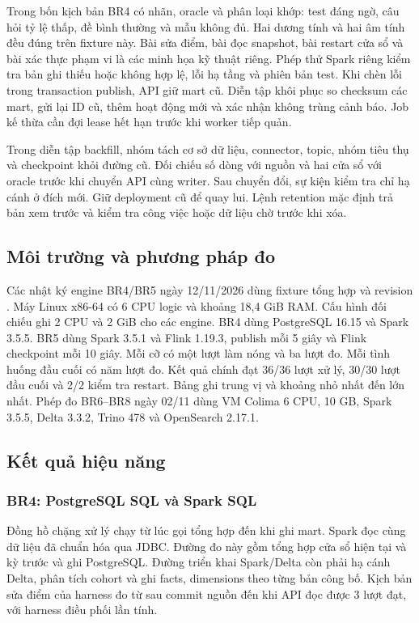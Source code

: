 Trong bốn kịch bản BR4 có nhãn, oracle và phân loại khớp: test đáng ngờ, câu hỏi tỷ lệ thấp, đề bình thường và mẫu không đủ. Hai dương tính và hai âm tính đều đúng trên fixture này. Bài sửa điểm, bài đọc snapshot, bài restart cửa sổ và bài xác thực phạm vi là các minh họa kỹ thuật riêng. Phép thử Spark riêng kiểm tra bản ghi thiếu hoặc không hợp lệ, lỗi hạ tầng và phiên bản test. Khi chèn lỗi trong transaction publish, API giữ mart cũ. Diễn tập khôi phục so checksum các mart, gửi lại ID cũ, thêm hoạt động mới và xác nhận không trùng cảnh báo. Job kế thừa cần đợi lease hết hạn trước khi worker tiếp quản.

Trong diễn tập backfill, nhóm tách cơ sở dữ liệu, connector, topic, nhóm tiêu thụ và checkpoint khỏi đường cũ. Đối chiếu số dòng với nguồn và hai cửa sổ với oracle trước khi chuyển API cùng writer. Sau chuyển đổi, sự kiện kiểm tra chỉ hạ cánh ở đích mới. Giữ deployment cũ để quay lui. Lệnh retention mặc định trả bản xem trước và kiểm tra công việc hoặc dữ liệu chờ trước khi xóa.

\subsection{Môi trường và phương pháp đo}

Các nhật ký engine BR4/BR5 ngày 12/11/2026 dùng fixture tổng hợp và revision . Máy Linux x86-64 có 6 CPU logic và khoảng 18{,}4 GiB RAM. Cấu hình đối chiếu ghi 2 CPU và 2 GiB cho các engine. BR4 dùng PostgreSQL 16.15 và Spark 3.5.5. BR5 dùng Spark 3.5.1 và Flink 1.19.3, publish mỗi 5 giây và Flink checkpoint mỗi 10 giây. Mỗi cỡ có một lượt làm nóng và ba lượt đo. Mỗi tình huống đầu cuối có năm lượt đo. Kết quả chính đạt 36/36 lượt xử lý, 30/30 lượt đầu cuối và 2/2 kiểm tra restart. Bảng ghi trung vị và khoảng nhỏ nhất đến lớn nhất. Phép đo BR6--BR8 ngày 02/11 dùng VM Colima 6 CPU, 10 GB, Spark 3.5.5, Delta 3.3.2, Trino 478 và OpenSearch 2.17.1.

\subsection{Kết quả hiệu năng}

\subsubsection{BR4: PostgreSQL SQL và Spark SQL}

Đồng hồ chặng xử lý chạy từ lúc gọi tổng hợp đến khi ghi mart. Spark đọc cùng dữ liệu đã chuẩn hóa qua JDBC. Đường đo này gồm tổng hợp cửa sổ hiện tại và kỳ trước và ghi PostgreSQL. Đường triển khai Spark/Delta còn phải hạ cánh Delta, phân tích cohort và ghi facts, dimensions theo từng bản công bố. Kịch bản sửa điểm của harness đo từ sau commit nguồn đến khi API đọc được 3 lượt đạt, với harness điều phối lần tính.


